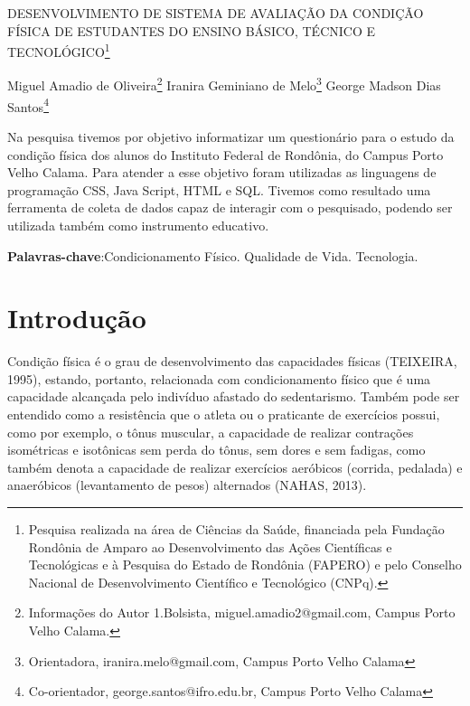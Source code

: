 \documentclass[article,12pt,onesidea,4paper,english,brazil]{abntex2}
\begin{document}
	
	
	\frenchspacing 
	
	\begin{center}
		\LARGE DESENVOLVIMENTO DE SISTEMA DE AVALIAÇÃO DA CONDIÇÃO FÍSICA DE ESTUDANTES DO ENSINO BÁSICO, TÉCNICO E TECNOLÓGICO\footnote{Pesquisa realizada na área de Ciências da Saúde, financiada pela Fundação Rondônia de Amparo ao Desenvolvimento das Ações Científicas e Tecnológicas e à Pesquisa do Estado de Rondônia (FAPERO) e pelo Conselho Nacional de Desenvolvimento Científico e Tecnológico (CNPq).}
		
		\normalsize
		Miguel Amadio de Oliveira\footnote{Informações do Autor 1.Bolsista, miguel.amadio2@gmail.com, Campus Porto Velho Calama.} 
	Iranira Geminiano de Melo\footnote{Orientadora, iranira.melo@gmail.com, Campus Porto Velho Calama} 
	George Madson Dias Santos\footnote{Co-orientador, george.santos@ifro.edu.br, Campus Porto Velho Calama}  
	\end{center}
	
	\begin{resumoumacoluna}
		Na pesquisa tivemos por objetivo informatizar um questionário para o estudo da condição física dos alunos do Instituto Federal de Rondônia, do Campus Porto Velho Calama. Para atender a esse objetivo foram utilizadas as linguagens de programação CSS, Java Script, HTML e SQL. Tivemos como resultado uma ferramenta de coleta de dados capaz de interagir com o pesquisado, podendo ser utilizada também como instrumento educativo.
		
		\vspace{\onelineskip}
		
		\noindent
		\textbf{Palavras-chave}:Condicionamento Físico. Qualidade de Vida. Tecnologia.
	\end{resumoumacoluna}
	
	\section*{Introdução}
	
Condição física é o grau de desenvolvimento das capacidades físicas (TEIXEIRA, 1995), estando, portanto, relacionada com condicionamento físico que é uma capacidade alcançada pelo indivíduo afastado do sedentarismo. Também pode ser entendido como a resistência que o atleta ou o praticante de exercícios possui, como por exemplo, o tônus muscular, a capacidade de realizar contrações isométricas e isotônicas sem perda do tônus, sem dores e sem fadigas, como também denota a capacidade de realizar exercícios aeróbicos (corrida, pedalada) e anaeróbicos (levantamento de pesos) alternados (NAHAS, 2013).
\end{document}
